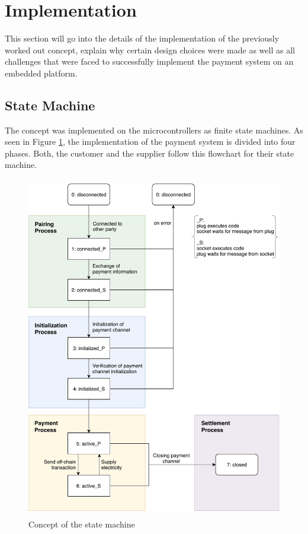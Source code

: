 \section{Implementation}
This section will go into the details of the implementation of the previously worked out concept, explain why certain design choices were made as well as all challenges that were faced to successfully implement the payment system on an embedded platform.
\\
\subsection{State Machine}
The concept was implemented on the microcontrollers as finite state machines.
As seen in Figure \ref{fig:state_machine}, the implementation of the payment system is divided into four phases.
Both, the customer and the supplier follow this flowchart for their state machine.
\\
\begin{figure}[H]
  \begin{center}
    \includegraphics[height=15cm]{img/state_machine.pdf}
    \caption{Concept of the state machine}
    \label{fig:state_machine}
  \end{center}
\end{figure}
